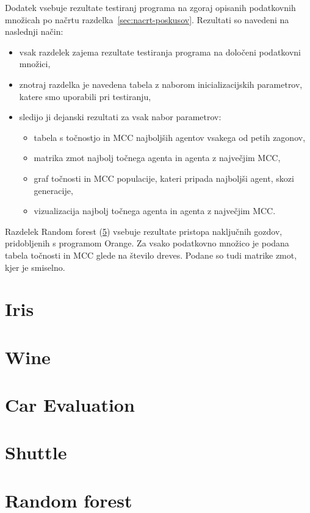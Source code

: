 Dodatek vsebuje rezultate testiranj programa na zgoraj opisanih podatkovnih množicah po načrtu razdelka~\ref{sec:nacrt-poskusov}.
Rezultati so navedeni na naslednji način:
\begin{itemize}
    \item vsak razdelek zajema rezultate testiranja programa na določeni podatkovni množici,
    \item znotraj razdelka je navedena tabela z naborom inicializacijskih parametrov, katere smo uporabili pri testiranju,
    \item sledijo ji dejanski rezultati za vsak nabor parametrov:
    \begin{itemize}
        \item tabela s točnostjo in MCC najboljših agentov vsakega od petih zagonov,
        \item matrika zmot najbolj točnega agenta in agenta z največjim MCC,
        \item graf točnosti in MCC populacije, kateri pripada najboljši agent, skozi generacije,
        \item vizualizacija najbolj točnega agenta in agenta z največjim MCC.
    \end{itemize}
\end{itemize}
Razdelek Random forest (\ref{sec:random-forest-test}) vsebuje rezultate pristopa naključnih gozdov, pridobljenih s programom Orange.
Za vsako podatkovno množico je podana tabela točnosti in MCC glede na število dreves.
Podane so tudi matrike zmot, kjer je smiselno.

\section{Iris}\label{sec:dodatek-iris-test}


\section{Wine}\label{sec:dodatek-wine-test}


\section{Car Evaluation}\label{sec:dodatek-car-test}


\section{Shuttle}\label{sec:dodatek-statlog-test}


\section{Random forest}\label{sec:random-forest-test}


